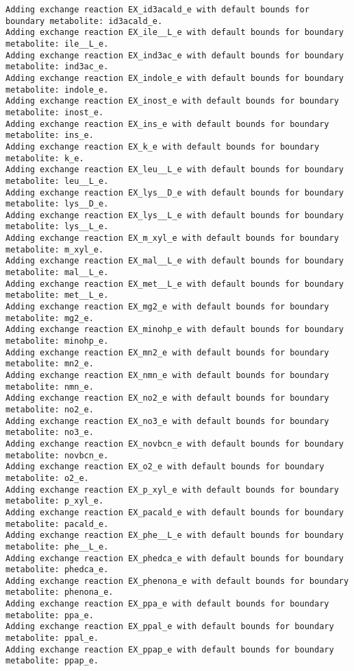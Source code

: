\documentclass[
  letterpaper,
  DIV=11,
  numbers=noendperiod]{scrartcl}
\begin{document}
\begin{verbatim}
Adding exchange reaction EX_id3acald_e with default bounds for boundary metabolite: id3acald_e.
Adding exchange reaction EX_ile__L_e with default bounds for boundary metabolite: ile__L_e.
Adding exchange reaction EX_ind3ac_e with default bounds for boundary metabolite: ind3ac_e.
Adding exchange reaction EX_indole_e with default bounds for boundary metabolite: indole_e.
Adding exchange reaction EX_inost_e with default bounds for boundary metabolite: inost_e.
Adding exchange reaction EX_ins_e with default bounds for boundary metabolite: ins_e.
Adding exchange reaction EX_k_e with default bounds for boundary metabolite: k_e.
Adding exchange reaction EX_leu__L_e with default bounds for boundary metabolite: leu__L_e.
Adding exchange reaction EX_lys__D_e with default bounds for boundary metabolite: lys__D_e.
Adding exchange reaction EX_lys__L_e with default bounds for boundary metabolite: lys__L_e.
Adding exchange reaction EX_m_xyl_e with default bounds for boundary metabolite: m_xyl_e.
Adding exchange reaction EX_mal__L_e with default bounds for boundary metabolite: mal__L_e.
Adding exchange reaction EX_met__L_e with default bounds for boundary metabolite: met__L_e.
Adding exchange reaction EX_mg2_e with default bounds for boundary metabolite: mg2_e.
Adding exchange reaction EX_minohp_e with default bounds for boundary metabolite: minohp_e.
Adding exchange reaction EX_mn2_e with default bounds for boundary metabolite: mn2_e.
Adding exchange reaction EX_nmn_e with default bounds for boundary metabolite: nmn_e.
Adding exchange reaction EX_no2_e with default bounds for boundary metabolite: no2_e.
Adding exchange reaction EX_no3_e with default bounds for boundary metabolite: no3_e.
Adding exchange reaction EX_novbcn_e with default bounds for boundary metabolite: novbcn_e.
Adding exchange reaction EX_o2_e with default bounds for boundary metabolite: o2_e.
Adding exchange reaction EX_p_xyl_e with default bounds for boundary metabolite: p_xyl_e.
Adding exchange reaction EX_pacald_e with default bounds for boundary metabolite: pacald_e.
Adding exchange reaction EX_phe__L_e with default bounds for boundary metabolite: phe__L_e.
Adding exchange reaction EX_phedca_e with default bounds for boundary metabolite: phedca_e.
Adding exchange reaction EX_phenona_e with default bounds for boundary metabolite: phenona_e.
Adding exchange reaction EX_ppa_e with default bounds for boundary metabolite: ppa_e.
Adding exchange reaction EX_ppal_e with default bounds for boundary metabolite: ppal_e.
Adding exchange reaction EX_ppap_e with default bounds for boundary metabolite: ppap_e.

\end{verbatim}
\end{document}

